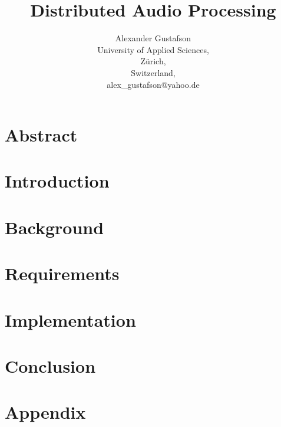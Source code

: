 \documentclass{report}
\title{Distributed Audio Processing}
\author{Alexander Gustafson\\
  University of Applied Sciences,\\
  Zürich,\\
  Switzerland,\\
  alex\_gustafson@yahoo.de}
\date{\parbox{\linewidth}{\centering%
  \today\endgraf\bigskip
  Dozent: Alexander Herrigel (alexander.herrigel@gmail.com)\endgraf\bigskip
  School of Engineering, Abteilung Zürich \endgraf
  Studiengang Informatik\endgraf
  }}
\begin{document}
\maketitle



\chapter*{Abstract}



\tableofcontents

\chapter{Introduction}



\chapter{Background}






\chapter{Requirements}







\chapter{Implementation}












\chapter{Conclusion}


{}


\chapter{Appendix}


\end{document}
